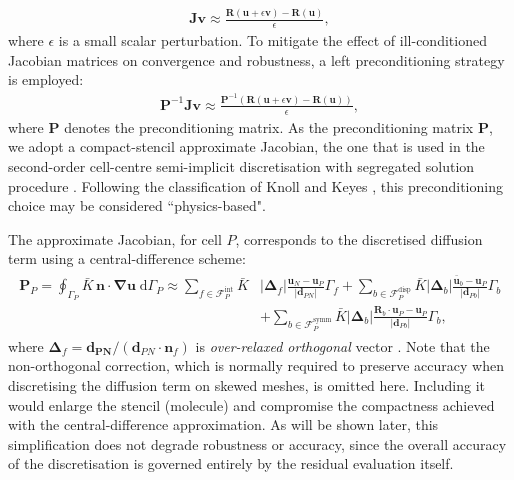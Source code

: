 \documentclass[sn-mathphys,Numbered]{sn-jnl}%
\newcommand{\bb}{\boldsymbol}
\begin{document}
%
\begin{eqnarray}
\bb{J} \bb{v} \approx \frac{\bb{R}(\bb{u}+\epsilon \bb{v})-\bb{R}(\bb{u})}{\epsilon},
\end{eqnarray}
%
where $\epsilon$ is a small scalar perturbation.
To mitigate the effect of ill-conditioned Jacobian matrices on convergence and robustness, a left preconditioning strategy is employed:
%
\begin{eqnarray}\label{eq:jfnk}
 	\bb{P}^{-1}\bb{J}  \bb{v}\approx 	\frac{\bb{P}^{-1}(\bb{R}(\bb{u} + \epsilon  \bb{v}) - \bb{R}(\bb{u}))}{\epsilon},
\end{eqnarray}
%
where $\bb{P}$ denotes the preconditioning matrix.
As the preconditioning matrix $\bb{P}$, we adopt a compact-stencil approximate Jacobian, the one that is used in the second-order cell-centre semi-implicit discretisation with segregated solution procedure \cite{Cardiff2018, Tukovic2018}. Following the classification of Knoll and Keyes \cite{Knoll2004}, this preconditioning choice may be considered ``physics-based".

The approximate Jacobian, for cell $P$, corresponds to the discretised diffusion term using a central-difference scheme:
%
\begin{eqnarray}
\begin{split}
 	\bb{P}_P = \oint_{\Gamma_P} \bar{K} \, \bb{n} \cdot \bb{\nabla} \bb{u} \; \text{d}\Gamma_P \approx
 		\sum_{f \in \mathcal{F}^{\text{int}}_P}  \bar{K} &
 		\left|\bb{\Delta}_{f} \right| \frac{ \bb{u}_{N} - \bb{u}_P}{\left|\bb{d}_{PN}\right|}    \Gamma_{f}
 	+  \sum_{b \in \mathcal{F}^{\text{disp}}_P}  \bar{K}
 		\left|\bb{\Delta}_{b} \right| \frac{ \bar{\bb{u}}_{b}  - \bb{u}_P}{\left|\bb{d}_{Pb}\right|}
 		{\Gamma}_{b}    \\
 	&	+ \sum_{b \in \mathcal{F}^{\text{symm}}_P}  \bar{K}
 		\left|\bb{\Delta}_{b} \right| \frac{ \bb{R}_{b} \cdot \bb{u}_{P} - \bb{u}_P}{\left|\bb{d}_{Pb}\right|} {\Gamma}_{b},
\end{split}
\end{eqnarray}
%
where $\bb{\Delta}_{f}=\bb{d_{PN}}/(\bb{d}_{PN} \cdot \bb{n}_f)$ is \emph{over-relaxed orthogonal} vector \cite{Demirdzic2015}.
Note that the non-orthogonal correction, which is normally required to preserve accuracy when discretising the diffusion term on skewed meshes, is omitted here.
Including it would enlarge the stencil (molecule) and compromise the compactness achieved with the central-difference approximation.
As will be shown later, this simplification does not degrade robustness or accuracy, since the overall accuracy of the discretisation is governed entirely by the residual evaluation itself.
\end{document}
